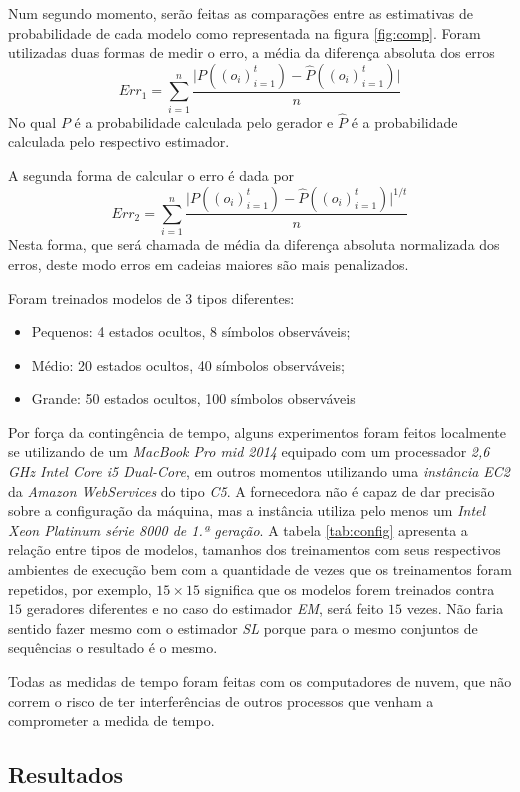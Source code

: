 \documentclass{subfiles}
\begin{document}
Num segundo momento, serão feitas as comparações entre as estimativas de probabilidade de cada modelo como representada na figura \ref{fig:comp}. Foram utilizadas duas formas de medir o erro, a média da diferença absoluta dos erros
\[
    Err_1 = \sum_{i=1}^n \frac{\vert P((o_i)_{i=1}^t) - \hat{P}((o_i)_{i=1}^t) \vert}{n}
\]
No qual $P$ é a probabilidade calculada pelo gerador e $\hat{P}$ é a probabilidade calculada pelo respectivo estimador.

A segunda forma de calcular o erro é dada por
\[
    Err_2 = \sum_{i=1}^n \frac{\vert P((o_i)_{i=1}^t) - \hat{P}((o_i)_{i=1}^t) \vert^{1/t}}{n}
\]
Nesta forma, que será chamada de média da diferença absoluta normalizada dos erros, deste modo erros em cadeias maiores são mais penalizados.

Foram treinados modelos de 3 tipos diferentes:
\begin{itemize}
    \item Pequenos: 4 estados ocultos, 8 símbolos observáveis;
    \item Médio: 20 estados ocultos, 40 símbolos observáveis;
    \item Grande: 50 estados ocultos, 100 símbolos observáveis
\end{itemize}

Por força da contingência de tempo, alguns experimentos foram feitos localmente se utilizando de um \textit{MacBook Pro mid 2014} equipado com um processador \textit{2,6 GHz Intel Core i5 Dual-Core}, em outros momentos utilizando uma \textit{instância EC2} da \textit{Amazon WebServices} do tipo \textit{C5}. A fornecedora não é capaz de dar precisão sobre a configuração da máquina, mas a instância utiliza pelo menos um \textit{Intel Xeon Platinum série 8000 de 1.ª geração}\autocite{AWS:2023EC2}. A tabela \ref{tab:config} apresenta a relação entre tipos de modelos, tamanhos dos treinamentos com seus respectivos ambientes de execução bem com a quantidade de vezes que os treinamentos foram repetidos, por exemplo, $15 \times 15$ significa que os modelos forem treinados contra $15$ geradores diferentes e no caso do estimador \textit{EM}, será feito $15$ vezes. Não faria sentido fazer mesmo com o estimador \textit{SL} porque para o mesmo conjuntos de sequências o resultado é o mesmo.

Todas as medidas de tempo foram feitas com os computadores de nuvem, que não correm o risco de ter interferências de outros processos que venham a comprometer a medida de tempo.

\subsection{Resultados}
\end{document}
